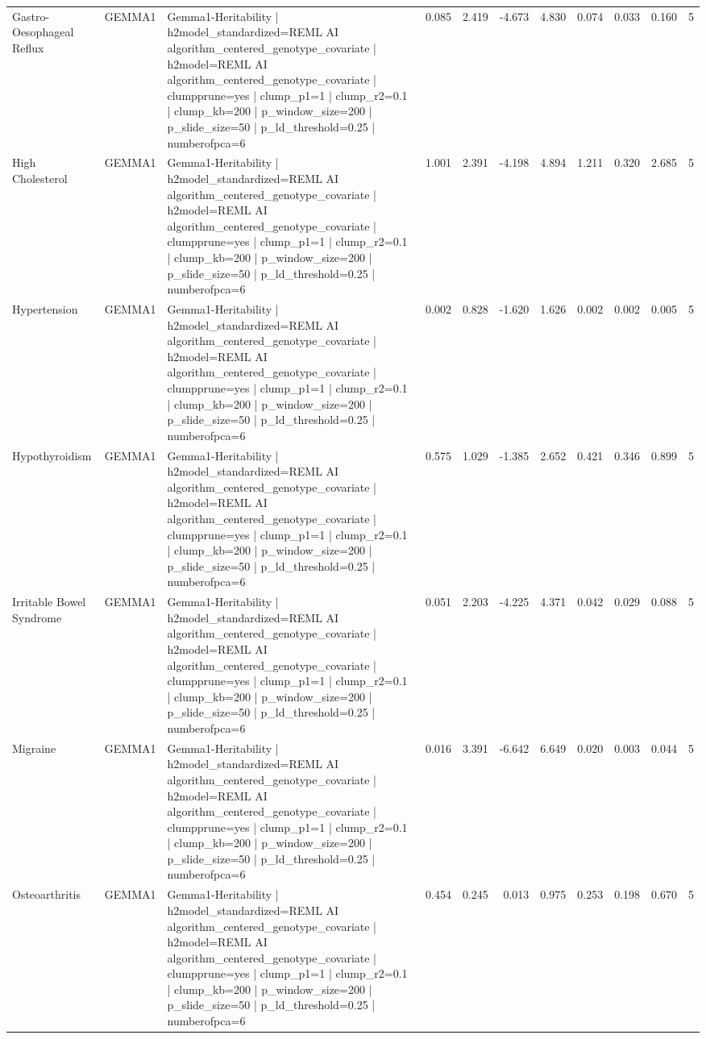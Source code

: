 \begin{landscape}
\begin{longtable}{p{2.4cm}p{1.8cm}p{6.0cm}rrrrrrrr}
Gastro-Oesophageal Reflux & GEMMA1 & Gemma1-Heritability | h2model\_standardized=REML AI algorithm\_centered\_genotype\_covariate | h2model=REML AI algorithm\_centered\_genotype\_covariate | clumpprune=yes | clump\_p1=1 | clump\_r2=0.1 | clump\_kb=200 | p\_window\_size=200 | p\_slide\_size=50 | p\_ld\_threshold=0.25 | numberofpca=6 & 0.085 & 2.419 & -4.673 & 4.830 & 0.074 & 0.033 & 0.160 & 5 \\
High Cholesterol & GEMMA1 & Gemma1-Heritability | h2model\_standardized=REML AI algorithm\_centered\_genotype\_covariate | h2model=REML AI algorithm\_centered\_genotype\_covariate | clumpprune=yes | clump\_p1=1 | clump\_r2=0.1 | clump\_kb=200 | p\_window\_size=200 | p\_slide\_size=50 | p\_ld\_threshold=0.25 | numberofpca=6 & 1.001 & 2.391 & -4.198 & 4.894 & 1.211 & 0.320 & 2.685 & 5 \\
Hypertension & GEMMA1 & Gemma1-Heritability | h2model\_standardized=REML AI algorithm\_centered\_genotype\_covariate | h2model=REML AI algorithm\_centered\_genotype\_covariate | clumpprune=yes | clump\_p1=1 | clump\_r2=0.1 | clump\_kb=200 | p\_window\_size=200 | p\_slide\_size=50 | p\_ld\_threshold=0.25 | numberofpca=6 & 0.002 & 0.828 & -1.620 & 1.626 & 0.002 & 0.002 & 0.005 & 5 \\
Hypothyroidism & GEMMA1 & Gemma1-Heritability | h2model\_standardized=REML AI algorithm\_centered\_genotype\_covariate | h2model=REML AI algorithm\_centered\_genotype\_covariate | clumpprune=yes | clump\_p1=1 | clump\_r2=0.1 | clump\_kb=200 | p\_window\_size=200 | p\_slide\_size=50 | p\_ld\_threshold=0.25 | numberofpca=6 & 0.575 & 1.029 & -1.385 & 2.652 & 0.421 & 0.346 & 0.899 & 5 \\
Irritable Bowel Syndrome & GEMMA1 & Gemma1-Heritability | h2model\_standardized=REML AI algorithm\_centered\_genotype\_covariate | h2model=REML AI algorithm\_centered\_genotype\_covariate | clumpprune=yes | clump\_p1=1 | clump\_r2=0.1 | clump\_kb=200 | p\_window\_size=200 | p\_slide\_size=50 | p\_ld\_threshold=0.25 | numberofpca=6 & 0.051 & 2.203 & -4.225 & 4.371 & 0.042 & 0.029 & 0.088 & 5 \\
Migraine & GEMMA1 & Gemma1-Heritability | h2model\_standardized=REML AI algorithm\_centered\_genotype\_covariate | h2model=REML AI algorithm\_centered\_genotype\_covariate | clumpprune=yes | clump\_p1=1 | clump\_r2=0.1 | clump\_kb=200 | p\_window\_size=200 | p\_slide\_size=50 | p\_ld\_threshold=0.25 | numberofpca=6 & 0.016 & 3.391 & -6.642 & 6.649 & 0.020 & 0.003 & 0.044 & 5 \\
Osteoarthritis & GEMMA1 & Gemma1-Heritability | h2model\_standardized=REML AI algorithm\_centered\_genotype\_covariate | h2model=REML AI algorithm\_centered\_genotype\_covariate | clumpprune=yes | clump\_p1=1 | clump\_r2=0.1 | clump\_kb=200 | p\_window\_size=200 | p\_slide\_size=50 | p\_ld\_threshold=0.25 | numberofpca=6 & 0.454 & 0.245 & 0.013 & 0.975 & 0.253 & 0.198 & 0.670 & 5 \\

\end{longtable}
\end{landscape}
